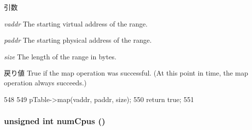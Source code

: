 \begin{DoxyParams}{引数}
\item[{\em vaddr}]The starting virtual address of the range. \item[{\em paddr}]The starting physical address of the range. \item[{\em size}]The length of the range in bytes. \end{DoxyParams}
\begin{DoxyReturn}{戻り値}
True if the map operation was successful. (At this point in time, the map operation always succeeds.) 
\end{DoxyReturn}



\begin{DoxyCode}
548 {
549     pTable->map(vaddr, paddr, size);
550     return true;
551 }
\end{DoxyCode}
\hypertarget{classProcess_ac5c70b967092e10582ce2f165e174890}{
\subsubsection[{numCpus}]{\setlength{\rightskip}{0pt plus 5cm}unsigned int numCpus ()}}
\label{classProcess_ac5c70b967092e10582ce2f165e174890}



